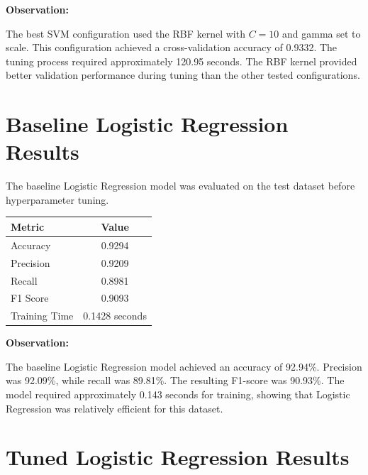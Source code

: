 \documentclass[12pt,a4paper]{article}
\begin{document}
\textbf{Observation:}

The best SVM configuration used the RBF kernel with $C=10$ and
gamma set to scale. This configuration achieved a cross-validation
accuracy of 0.9332. The tuning process required approximately
120.95 seconds. The RBF kernel provided better validation performance
during tuning than the other tested configurations.


\section{Baseline Logistic Regression Results}

The baseline Logistic Regression model was evaluated on the test
dataset before hyperparameter tuning.

\begin{longtable}{|p{7cm}|c|}
\hline
\textbf{Metric} & \textbf{Value} \\ \hline

Accuracy & 0.9294 \\ \hline

Precision & 0.9209 \\ \hline

Recall & 0.8981 \\ \hline

F1 Score & 0.9093 \\ \hline

Training Time & 0.1428 seconds \\ \hline

\end{longtable}

\textbf{Observation:}

The baseline Logistic Regression model achieved an accuracy of
92.94\%. Precision was 92.09\%, while recall was 89.81\%.
The resulting F1-score was 90.93\%. The model required approximately
0.143 seconds for training, showing that Logistic Regression was
relatively efficient for this dataset.


\section{Tuned Logistic Regression Results}
\end{document}
